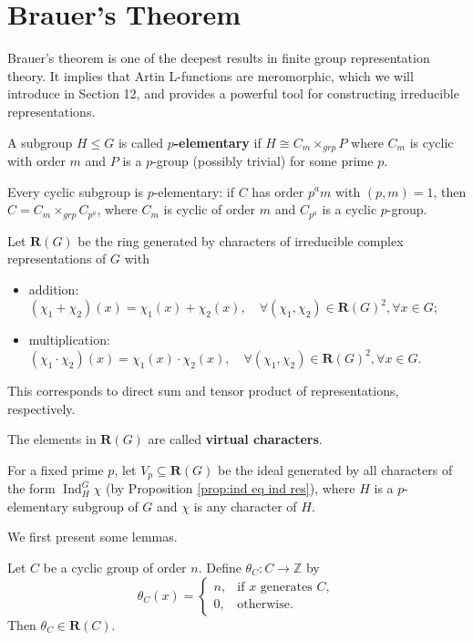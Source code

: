 
\chapter{Brauer's Theorem}
Brauer's theorem is one of the deepest results in finite group representation theory. 
 It implies that Artin L-functions are meromorphic, which we will introduce in Section 12, and provides a powerful tool for constructing irreducible representations.
\begin{defn}[Elementary]
A subgroup \(H \le G\) is called \textbf{$p$-elementary} if \(H \cong C_m \times_{grp} P\) where \(C_m\) is cyclic with order $m$ and \(P\) is a \(p\)-group (possibly trivial) for some prime $p$.
\end{defn}

\begin{remark}
Every cyclic subgroup is \(p\)-elementary: if \(C\) has order \(p^a m\) with \((p,m)=1\), then \(C = C_m \times_{grp} C_{p^a}\), where \(C_m\) is cyclic of order \(m\) and \(C_{p^a}\) is a cyclic \(p\)-group.
\end{remark}

\begin{defn}
Let \(\mathbf{R}(G)\) be the ring generated by characters of irreducible complex representations of $G$ with
\begin{itemize}
    \item addition: \((\chi_1 + \chi_2)(x) = \chi_1(x) + \chi_2(x),\quad\forall(\chi_1,\chi_2)\in \mathbf{R}(G)^2,\forall x\in G\);
    \item multiplication: \((\chi_1 \cdot \chi_2)(x) = \chi_1(x) \cdot \chi_2(x),\quad\forall(\chi_1,\chi_2)\in \mathbf{R}(G)^2,\forall x\in G\).
\end{itemize}
This corresponds to direct sum and tensor product of representations, respectively.

 The elements in $\mathbf{R}(G)$ are called \textbf{virtual characters}.

 For a fixed prime \(p\), let \(V_p \subseteq \mathbf{R}(G)\) be the ideal generated by all characters of the form \(\operatorname{Ind}_H^G \chi\) (by Proposition \ref{prop:ind eq ind res}), where \(H\) is a \(p\)-elementary subgroup of \(G\) and \(\chi\) is any character of \(H\).
\end{defn}

We first present some lemmas.

\begin{lemma}
Let \(C\) be a cyclic group of order \(n\). Define \(\theta_C: C \to \mathbb{Z}\) by
\[
\theta_C(x) =
\begin{cases}
n, & \text{if } x \text{ generates } C,\\
0, & \text{otherwise}.
\end{cases}
\]
Then \(\theta_C \in \mathbf{R}(C)\).
\end{lemma}


